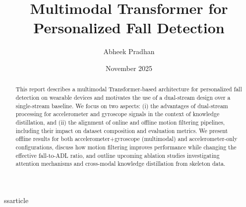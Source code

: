 ss{article}

\usepackage[margin=1in]{geometry}
\usepackage{graphicx}
\usepackage{amsmath}
\usepackage{booktabs}
\usepackage{siunitx}
\usepackage{enumitem}
\usepackage[colorlinks=true, linkcolor=blue, urlcolor=blue, citecolor=blue]{hyperref}


\title{Multimodal Transformer for Personalized Fall Detection}
\author{Abheek Pradhan}
\date{November 2025}



\maketitle

\begin{abstract}
This report describes a multimodal Transformer-based architecture for personalized fall detection on wearable devices and motivates the use of a dual-stream design over a single-stream baseline. We focus on two aspects: (i) the advantages of dual-stream processing for accelerometer and gyroscope signals in the context of knowledge distillation, and (ii) the alignment of online and offline motion filtering pipelines, including their impact on dataset composition and evaluation metrics. We present offline results for both accelerometer+gyroscope (multimodal) and accelerometer-only configurations, discuss how motion filtering improves performance while changing the effective fall-to-ADL ratio, and outline upcoming ablation studies investigating attention mechanisms and cross-modal knowledge distillation from skeleton data.
\end{abstract}

\tableofcontents
\bigskip

